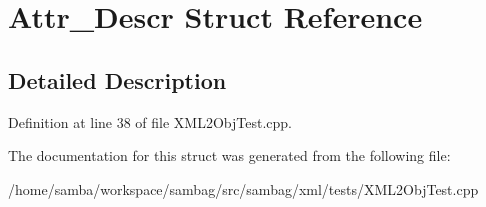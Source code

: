 \hypertarget{struct_attr___descr}{
\section{Attr\_\-Descr Struct Reference}
\label{struct_attr___descr}
}


\subsection{Detailed Description}


Definition at line 38 of file XML2ObjTest.cpp.



The documentation for this struct was generated from the following file:\begin{DoxyCompactItemize}
\item 
/home/samba/workspace/sambag/src/sambag/xml/tests/XML2ObjTest.cpp\end{DoxyCompactItemize}
